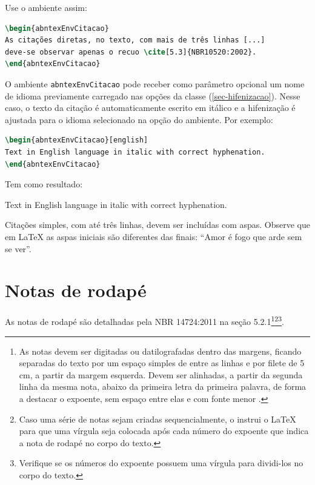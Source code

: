 Use o ambiente assim:

\begin{lstlisting}[language=tex]
\begin{abntexEnvCitacao}
As citações diretas, no texto, com mais de três linhas [...]
deve-se observar apenas o recuo \cite[5.3]{NBR10520:2002}.
\end{abntexEnvCitacao}
\end{lstlisting}

O ambiente \texttt{abntexEnvCitacao} pode receber como parâmetro opcional um
nome de idioma previamente carregado nas opções da classe
(\autoref{sec-hifenizacao}).  Nesse caso, o texto da citação é automaticamente
escrito em itálico e a hifenização é ajustada para o idioma selecionado na opção
do ambiente. Por exemplo:

\begin{lstlisting}[language=tex]
\begin{abntexEnvCitacao}[english]
Text in English language in italic with correct hyphenation. 
\end{abntexEnvCitacao}
\end{lstlisting}

Tem como resultado:

\begin{abntexEnvCitacao}[english]
Text in English language in italic with correct hyphenation. 
\end{abntexEnvCitacao}

Citações simples, com até três linhas, devem ser
incluídas com aspas. Observe que em \LaTeX{} as aspas iniciais são diferentes
das finais: ``Amor é fogo que arde sem se ver''. 

\section{Notas de rodapé}

As notas de rodapé são detalhadas pela NBR 14724:2011 na seção 5.2.1\footnote{As
    notas devem ser digitadas ou datilografadas dentro das margens, ficando
    separadas do texto por um espaço simples de entre as linhas e por filete de
    5 cm, a partir da margem esquerda. Devem ser alinhadas, a partir da segunda
    linha da mesma nota, abaixo da primeira letra da primeira palavra, de forma
a destacar o expoente, sem espaço entre elas e com fonte menor 
\textcite[5.2.1]{NBR14724:2011}. }\footnote{Caso uma série de notas
sejam criadas sequencialmente, o \abnTeX{} instrui o \LaTeX{} para que uma
vírgula seja colocada após cada número do expoente que indica a nota de rodapé
no corpo do texto. }\footnote{Verifique se os números do expoente
    possuem uma vírgula para dividi-los no corpo do texto. }.


